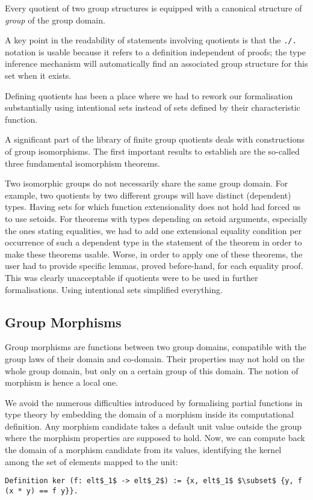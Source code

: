 Every quotient  of two group structures is equipped with a
canonical structure of \emph{group} of the  group domain.

A key point in the readability of statements involving quotients is
that the \lstinline[basicstyle=\footnotesize]+./.+ notation is usable
because it refers to a definition independent of proofs; the type
inference mechanism will automatically find an associated group
structure for this set when it exists.

Defining quotients has been a place where we had to rework our
formalisation substantially using intentional sets instead of sets
defined by their characteristic function.

A significant part of the library of finite group quotients deals with
constructions of group isomorphisms. The first important  results to
establish are the
so-called three fundamental isomorphism theorems. 

Two isomorphic groups do
not necessarily share the same group domain. For example, two
quotients by two different groups will have distinct (dependent) types.
Having sets for which function extensionality does not hold had forced
us to use setoids.  For theorems with types depending on setoid
arguments, especially the ones stating equalities, we had to add one
extensional equality condition per occurrence of such a dependent type
in the statement of the theorem in order to make these theorems
usable. Worse, in order to apply one of
these theorems, the user had to provide specific lemmas, proved
before-hand, for each equality proof.  This was clearly unacceptable
if quotients were to be used in further formalisations.  Using
intentional sets simplified everything.


\subsection{Group Morphisms}\label{ssec:morphisms}
Group morphisms are functions between two group domains, compatible
 with the group laws of their domain and
co-domain. Their properties may not hold on the whole group domain, but only
on a certain group of this domain. The notion of morphism is hence a
local one.

We avoid the numerous difficulties introduced by formalising
partial functions in type theory by embedding the domain of a morphism
inside its computational definition. Any morphism candidate takes a
default unit value outside the group where the morphism properties are
supposed to hold.  Now, we can compute back the domain of a
morphism candidate from its values, identifying the kernel among the
set of elements mapped to the unit:
\begin{lstlisting} 
Definition ker (f: elt$_1$ -> elt$_2$) := {x, elt$_1$ $\subset$ {y, f (x * y) == f y}}.

\end{lstlisting}

